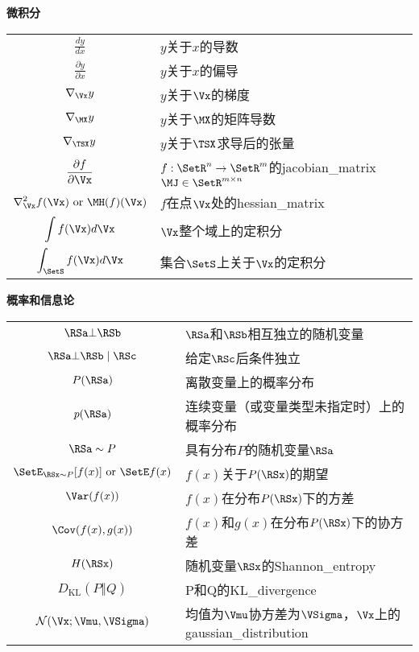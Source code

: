 \vspace{\notationgap}
\begin{minipage}{\textwidth}
\centerline{\bf 微积分}
\bgroup
\def\arraystretch{1.5}
\begin{tabular}{cp{3.25in}}
$\displaystyle\frac{d y} {d x}$ &  $y$关于$x$的导数 \\
$\displaystyle \frac{\partial y} {\partial x} $ &  $y$关于$x$的偏导 \\
$\displaystyle \nabla_{\Vx} y $ & $y$关于$\Vx$的梯度 \\
$\displaystyle \nabla_{\MX} y $ & $y$关于$\MX$的矩阵导数 \\
$\displaystyle \nabla_{\TSX} y $ &  $y$关于$\TSX$求导后的张量 \\
$\displaystyle \frac{\partial f}{\partial \Vx} $ &$f: \SetR^n \rightarrow \SetR^m$的\gls{jacobian_matrix}$\MJ \in \SetR^{m\times n}$   \\
$\displaystyle \nabla_{\Vx}^2 f(\Vx)\text{ or }\MH( f)(\Vx)$ &  $f$在点$\Vx$处的\gls{hessian_matrix} \\
$\displaystyle \int f(\Vx) d\Vx $ & $\Vx$整个域上的定积分 \\
$\displaystyle \int_\SetS f(\Vx) d\Vx$ & 集合$\SetS$上关于$\Vx$的定积分 \\
\end{tabular}
\egroup
\end{minipage}

\vspace{\notationgap}
\begin{minipage}{\textwidth}
\centerline{\bf 概率和信息论}
\bgroup
\def\arraystretch{1.5}
\begin{tabular}{cp{3.25in}}
$\displaystyle \RSa \bot \RSb$ &  $\RSa$和$\RSb$相互独立的随机变量 \\
$\displaystyle \RSa \bot \RSb \mid \RSc $ &  给定$\RSc$后条件独立 \\
$\displaystyle P(\RSa)$ & 离散变量上的概率分布 \\
$\displaystyle p(\RSa)$ & 连续变量（或变量类型未指定时）上的概率分布  \\
$\displaystyle \RSa \sim P$ &  具有分布$P$的随机变量$\RSa$\\
$\displaystyle  \SetE_{\RSx\sim P} [ f(x) ]\text{ or } \SetE f(x)$ & $f(x)$关于$P(\RSx)$的期望 \\
$\displaystyle \Var(f(x)) $ &  $f(x)$在分布$P(\RSx)$下的方差 \\
$\displaystyle \Cov(f(x),g(x)) $ &  $f(x)$和$g(x)$在分布$P(\RSx)$下的协方差 \\
$\displaystyle H(\RSx) $ & 随机变量$\RSx$的\gls{Shannon_entropy} \\
$\displaystyle D_{\text{KL}} ( P \Vert Q ) $ & P和Q的\gls{KL_divergence} \\
$\displaystyle \mathcal{N} ( \Vx ; \Vmu , \VSigma)$ & 均值为$\Vmu$协方差为$\VSigma$，$\Vx$上的\gls{gaussian_distribution} \\
\end{tabular}
\egroup
\end{minipage}

